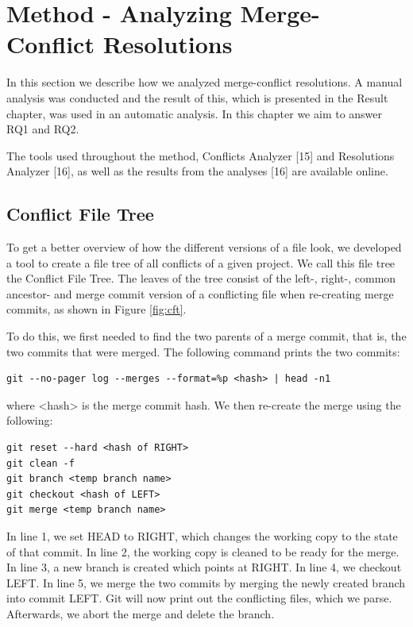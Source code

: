 \chapter{Method - Analyzing Merge-Conflict Resolutions}
In this section we describe how we analyzed merge-conflict resolutions. A manual analysis was conducted and the result of this, which is presented in the Result chapter, was used in an automatic analysis. In this chapter we aim to answer RQ1 and RQ2.

The tools used throughout the method, Conflicts Analyzer [15] and Resolutions Analyzer [16], as well as the results from the analyses [16] are available online.
\section{Conflict File Tree}\label{sec:cft}
To get a better overview of how the different versions of a file look, we developed a tool to create a file tree of all conflicts of a given project. We call this file tree the Conflict File Tree. The leaves of the tree consist of the left-, right-, common ancestor- and merge commit version of a conflicting file when re-creating merge commits, as shown in Figure \ref{fig:cft}.

To do this, we first needed to find the two parents of a merge commit, that is, the two commits that were merged. The following command prints the two commits:
\lstset{language=Bash,numbers=left,xleftmargin=2em,frame=single,framexleftmargin=1.5em}
\begin{lstlisting}[frame=single,breaklines=true,tabsize=2]
git --no-pager log --merges --format=%p <hash> | head -n1
\end{lstlisting}
where <hash> is the merge commit hash. We then re-create the merge using the following:
\lstset{language=Bash,numbers=left,xleftmargin=2em,frame=single,framexleftmargin=1.5em}
\begin{lstlisting}[frame=single,breaklines=true,tabsize=2]
git reset --hard <hash of RIGHT>
git clean -f
git branch <temp branch name>
git checkout <hash of LEFT>
git merge <temp branch name>
\end{lstlisting}
In line 1, we set HEAD to RIGHT, which changes the working copy to the state of that commit. In line 2,  the working copy is cleaned to be ready for the merge. In line 3, a new branch is created which points at RIGHT. In line 4, we checkout LEFT. In line 5, we merge the two commits by merging the newly created branch into commit LEFT. Git will now print out the conflicting files, which we parse. Afterwards, we abort the merge and delete the branch.

